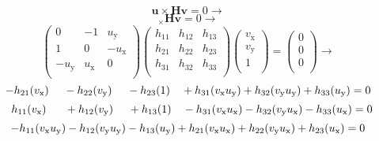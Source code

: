 \begin{equation}
\mathbf{u} \times \mathbf{H}\mathbf{v}=0 \rightarrow
\end{equation}
\begin{equation}
[\mathbf{u}]_{\times} \mathbf{H}\mathbf{v}=0 \rightarrow
\end{equation}
\begin{equation}
\begin{pmatrix}
0 & -1 & u_\mathrm{y} \\
1 & 0 & -u_\mathrm{x} \\
-u_\mathrm{y} & u_\mathrm{x} & 0 \\
\end{pmatrix}
\begin{pmatrix}
h_{11} & h_{12} & h_{13} \\
h_{21} & h_{22} & h_{23} \\
h_{31} & h_{32} & h_{33} \\
\end{pmatrix}
\begin{pmatrix}
v_\mathrm{x} \\
v_\mathrm{y} \\
1 \\
\end{pmatrix}
=
\begin{pmatrix}
0 \\
0 \\
0 \\
\end{pmatrix}
\rightarrow
\end{equation}
\begin{equation}
-h_{21} (v_\mathrm{x}) \ \ \ \ - h_{22} (v_\mathrm{y}) \ \ \ \ - h_{23} (1) \ \ \ + h_{31} (v_\mathrm{x} u_\mathrm{y}) + h_{32} (v_\mathrm{y} u_\mathrm{y}) + h_{33} (u_\mathrm{y}) = 0 \\
\label{eqn:H-1}
\end{equation}
\begin{equation}
\ \ h_{11} (v_\mathrm{x}) \ \ \ \ \ + h_{12} (v_\mathrm{y}) \ \ \ \ + h_{13} (1) \ \ \ -h_{31} (v_\mathrm{x} u_\mathrm{x}) -h_{32} (v_\mathrm{y} u_\mathrm{x}) - h_{33} (u_\mathrm{x}) = 0 \\
\label{eqn:H-2}
\end{equation}
\begin{equation}
-h_{11} (v_\mathrm{x} u_\mathrm{y}) -h_{12} (v_\mathrm{y} u_\mathrm{y}) -h_{13} (u_\mathrm{y}) + h_{21} (v_\mathrm{x} u_\mathrm{x}) + h_{22} (v_\mathrm{y} u_\mathrm{x}) + h_{23} (u_\mathrm{x}) = 0 \\
\label{eqn:H-3}
\end{equation}

